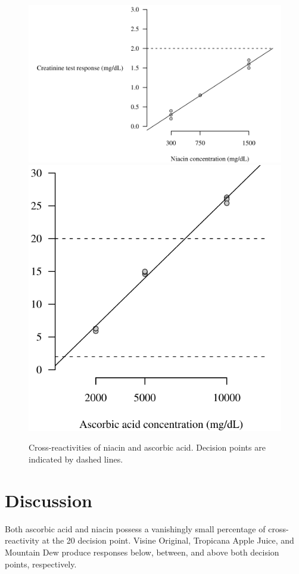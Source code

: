 \documentclass[article,11pt,oneside]{memoir}
\begin{document}
\begin{figure}[h!]
\centering
\includegraphics[scale=0.63]{b3}\includegraphics[scale=0.63]{aa}
\caption{Cross-reactivities of niacin and ascorbic acid. Decision points are indicated by dashed lines.}
\label{ascorbate}
\end{figure}

\section{Discussion}
Both ascorbic acid and niacin possess a vanishingly small percentage of cross-reactivity at the \unit{20}{\milli\gram\per\deci\liter} decision point.
Visine Original, Tropicana Apple Juice, and Mountain Dew produce responses below, between, and above both decision points, respectively.
\end{document}
